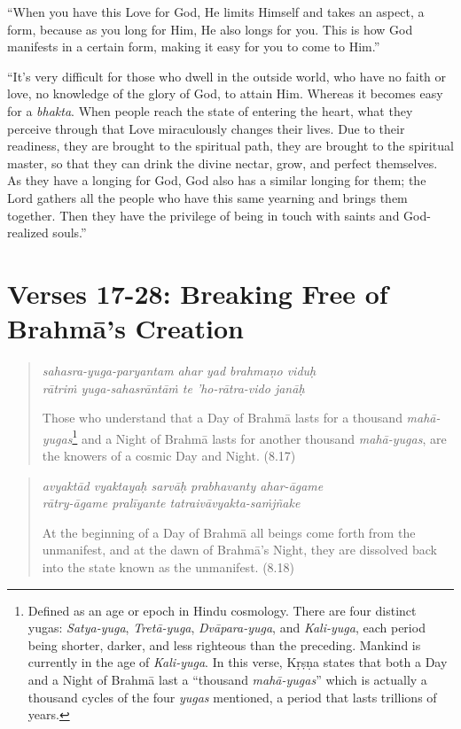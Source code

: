 \documentclass[12pt, twoside, openright]{memoir}
\begin{document}
\enquote{When you have this Love for God, He limits Himself and takes an aspect, a form, because as you long for Him, He also longs for you. This is how God manifests in a certain form, making it easy for you to come to Him.}

\enquote{It’s very difficult for those who dwell in the outside world, who have no faith or love, no knowledge of the glory of God, to attain Him. Whereas it becomes easy for a \textit{bhakta}. When people reach the state of entering the heart, what they perceive through that Love miraculously changes their lives. Due to their readiness, they are brought to the spiritual path, they are brought to the spiritual master, so that they can drink the divine nectar, grow, and perfect themselves. As they have a longing for God, God also has a similar longing for them; the Lord gathers all the people who have this same yearning and brings them together. Then they have the privilege of being in touch with saints and God-realized souls.}

\section{Verses 17-28: Breaking Free of Brahmā's Creation}\label{sec-verses-17-28-breaking-free-of-brahma-s-creation}


\par
\begin{verse}
\textit{sahasra-yuga-paryantam ahar yad brahmaṇo viduḥ} \\
\textit{rātriṁ yuga-sahasrāntāṁ te ’ho-rātra-vido janāḥ}

\noindent Those who understand that a Day of Brahmā lasts for a thousand \textit{mahā-yugas}\footnote{Defined as an age or epoch in Hindu cosmology. There are four distinct yugas: \textit{Satya-yuga}, \textit{Tretā-yuga}, \textit{Dvāpara-yuga}, and \textit{Kali-yuga}, each period being shorter, darker, and less righteous than the preceding. Mankind is currently in the age of \textit{Kali-yuga}. In this verse, Kṛṣṇa states that both a Day and a Night of Brahmā last a \enquote{thousand \textit{mahā-yugas}} which is actually a thousand cycles of the four \textit{yugas} mentioned, a period that lasts trillions of years.} and a Night of Brahmā lasts for another thousand \textit{mahā-yugas}, are the knowers of a cosmic Day and Night. (8.17)
\end{verse}
\par



\par
\begin{verse}
\textit{avyaktād vyaktayaḥ sarvāḥ prabhavanty ahar-āgame} \\
\textit{rātry-āgame pralīyante tatraivāvyakta-saṁjñake}

\noindent At the beginning of a Day of Brahmā all beings come forth from the unmanifest, and at the dawn of Brahmā's Night, they are dissolved back into the state known as the unmanifest. (8.18)
\end{verse}
\par
\end{document}
